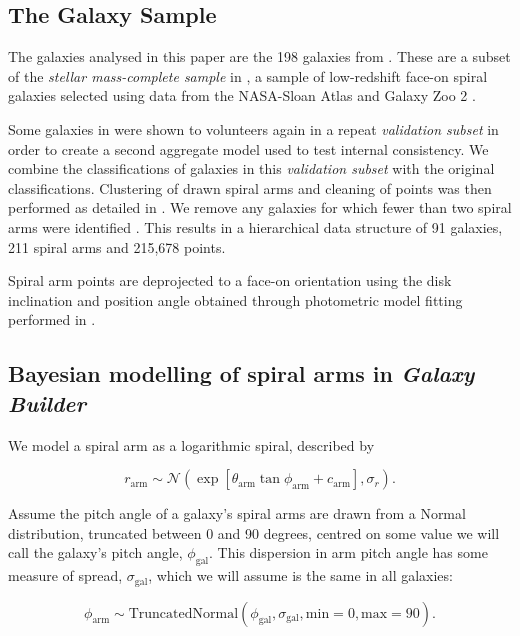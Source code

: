 \subsection{The Galaxy Sample}
The galaxies analysed in this paper are the 198 galaxies from \Lingard. These are a subset of the \textit{stellar mass-complete sample} in \citet{2017MNRAS.472.2263H}, a sample of low-redshift face-on spiral galaxies selected using data from the NASA-Sloan Atlas \citep{2011AJ....142...31B} and Galaxy Zoo 2 \citep{Willett2013:1308.3496v2}.

Some galaxies in \Lingard were shown to volunteers again in a repeat \textit{validation subset} in order to create a second aggregate model used to test internal consistency. We combine the classifications of galaxies in this \textit{validation subset} with the original classifications. Clustering of drawn spiral arms and cleaning of points was then performed as detailed in \Lingard. We remove any galaxies for which fewer than two spiral arms were identified . This results in a hierarchical data structure of 91 galaxies, 211 spiral arms and 215,678 points.

Spiral arm points are deprojected to a face-on orientation using the disk inclination and position angle obtained through photometric model fitting performed in \Lingard.

\subsection{Bayesian modelling of spiral arms in \textit{Galaxy Builder}}

We model a spiral arm as a logarithmic spiral, described by

\begin{equation}
r_\mathrm{arm} \sim \mathcal{N}\left(\exp\left[\theta_\mathrm{arm}\tan\phi_\mathrm{arm} + c_\mathrm{arm}\right], \sigma_r\right).
\end{equation}

Assume the pitch angle of a galaxy's spiral arms are drawn from a Normal distribution, truncated between 0 and 90 degrees, centred on some value we will call the galaxy's pitch angle, $\phi_\mathrm{gal}$. This dispersion in arm pitch angle has some measure of spread, $\sigma_\mathrm{gal}$, which we will assume is the same in all galaxies:

\begin{equation}
\phi_\mathrm{arm} \sim \mathrm{TruncatedNormal}(\phi_\mathrm{gal}, \sigma_\mathrm{gal}, \mathrm{min}=0, \mathrm{max}=90).
\end{equation}

